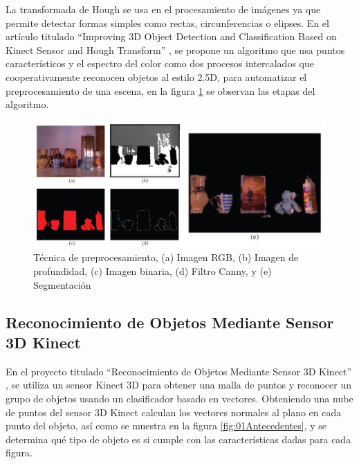         La transformada de Hough se usa en el procesamiento de imágenes ya que permite detectar formas simples como rectas, circunferencias o elipses. En el artículo titulado “Improving 3D Object Detection and Classification Based on Kinect Sensor and Hough Transform” \cite{CompVisionKinecthough}, se propone un algoritmo que usa puntos característicos y el espectro del color como dos procesos intercalados que cooperativamente reconocen objetos al estilo 2.5D, para automatizar el preprocesamiento de una escena, en la figura \ref{fig:03Antecedentes} se observan las etapas del algoritmo.\\
    
        \begin{figure}[!htb]
            \centering
            \includegraphics[width=1\textwidth]{01Introduccion/imagenes/03Antecedentes.jpg}
            \caption[Técnica de preprocesamiento]{Técnica de preprocesamiento, (a) Imagen RGB, (b) Imagen de profundidad, (c) Imagen binaria, (d) Filtro Canny, y (e) Segmentación}%
            \label{fig:03Antecedentes}
        \end{figure}
    
    
    \subsection{Reconocimiento de Objetos Mediante Sensor 3D Kinect}
    
        En el proyecto titulado “Reconocimiento de Objetos Mediante Sensor 3D Kinect” \cite{RecoObj3d}, se utiliza un sensor Kinect 3D para obtener una malla de puntos y reconocer un grupo de objetos usando un clasificador basado en vectores. Obteniendo una nube de puntos del sensor 3D Kinect calculan los vectores normales al plano en cada punto del objeto, así como se muestra en la figura \ref{fig:01Antecedentes}, y se determina qué tipo de objeto es si cumple con las características dadas para cada figura. \\
        
